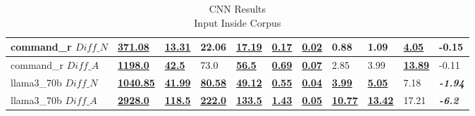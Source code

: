 \documentclass[11pt]{article}
\begin{document}
\begin{table}[ht]
{\begin{tabular}{lllllllllll}
            command\_r $Diff\_N$  & \textbf{\underline{371.08}}  & \textbf{\underline{13.31}}  & 22.06                       & \textbf{\underline{17.19}} & \textbf{\underline{0.17}} & \textbf{\underline{0.02}} & 0.88                       & 1.09                       & \textbf{\underline{4.05}}  & -0.15                   \\ \midrule
            command\_r $Diff\_A$  & \textbf{\underline{1198.0}}  & \textbf{\underline{42.5}}   & 73.0                        & \textbf{\underline{56.5}}  & \textbf{\underline{0.69}} & \textbf{\underline{0.07}} & 2.85                       & 3.99                       & \textbf{\underline{13.89}} & -0.11                   \\ \midrule
            llama3\_70b $Diff\_N$ & \textbf{\underline{1040.85}} & \textbf{\underline{41.99}}  & \textbf{\underline{80.58}}  & \textbf{\underline{49.12}} & \textbf{\underline{0.55}} & \textbf{\underline{0.04}} & \textbf{\underline{3.99}}  & \textbf{\underline{5.05}}  & 7.18                       & \textbf{\textit{-1.94}} \\ \midrule
            llama3\_70b $Diff\_A$ & \textbf{\underline{2928.0}}  & \textbf{\underline{118.5}}  & \textbf{\underline{222.0}}  & \textbf{\underline{133.5}} & \textbf{\underline{1.43}} & \textbf{\underline{0.05}} & \textbf{\underline{10.77}} & \textbf{\underline{13.42}} & 17.21                      & \textbf{\textit{-6.2}}  \\ \bottomrule
        \end{tabular}%
    }
    \caption{CNN Results\\Input Inside Corpus}\label{table-prompt-2-ifd-cnn-dailymail}
\end{table}
\end{document}
